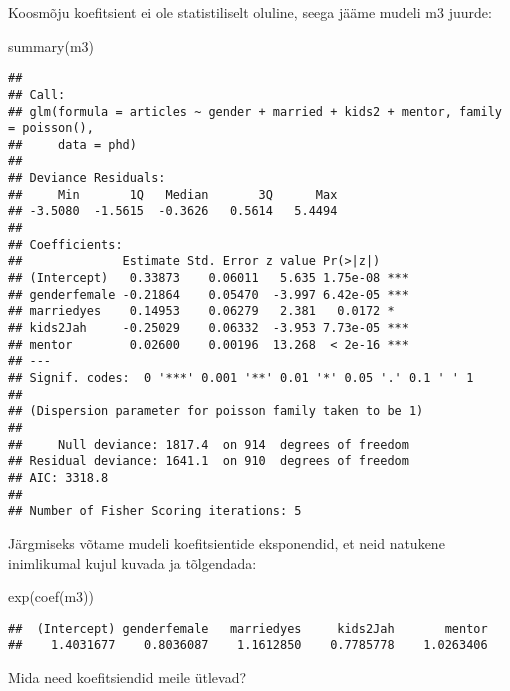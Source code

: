 \documentclass[
]{book}
\newenvironment{Shaded}{\begin{snugshade}}{\end{snugshade}}
\newcommand{\FunctionTok}[1]{\textcolor[rgb]{0.00,0.00,0.00}{#1}}
\newcommand{\NormalTok}[1]{#1}
\begin{document}
Koosmõju koefitsient ei ole statistiliselt oluline, seega jääme mudeli m3 juurde:

\begin{Shaded}
\begin{Highlighting}[]
\FunctionTok{summary}\NormalTok{(m3)}
\end{Highlighting}
\end{Shaded}

\begin{verbatim}
## 
## Call:
## glm(formula = articles ~ gender + married + kids2 + mentor, family = poisson(), 
##     data = phd)
## 
## Deviance Residuals: 
##     Min       1Q   Median       3Q      Max  
## -3.5080  -1.5615  -0.3626   0.5614   5.4494  
## 
## Coefficients:
##              Estimate Std. Error z value Pr(>|z|)    
## (Intercept)   0.33873    0.06011   5.635 1.75e-08 ***
## genderfemale -0.21864    0.05470  -3.997 6.42e-05 ***
## marriedyes    0.14953    0.06279   2.381   0.0172 *  
## kids2Jah     -0.25029    0.06332  -3.953 7.73e-05 ***
## mentor        0.02600    0.00196  13.268  < 2e-16 ***
## ---
## Signif. codes:  0 '***' 0.001 '**' 0.01 '*' 0.05 '.' 0.1 ' ' 1
## 
## (Dispersion parameter for poisson family taken to be 1)
## 
##     Null deviance: 1817.4  on 914  degrees of freedom
## Residual deviance: 1641.1  on 910  degrees of freedom
## AIC: 3318.8
## 
## Number of Fisher Scoring iterations: 5
\end{verbatim}

Järgmiseks võtame mudeli koefitsientide eksponendid, et neid natukene inimlikumal kujul kuvada ja tõlgendada:

\begin{Shaded}
\begin{Highlighting}[]
\FunctionTok{exp}\NormalTok{(}\FunctionTok{coef}\NormalTok{(m3))}
\end{Highlighting}
\end{Shaded}

\begin{verbatim}
##  (Intercept) genderfemale   marriedyes     kids2Jah       mentor 
##    1.4031677    0.8036087    1.1612850    0.7785778    1.0263406
\end{verbatim}

Mida need koefitsiendid meile ütlevad?
\end{document}
